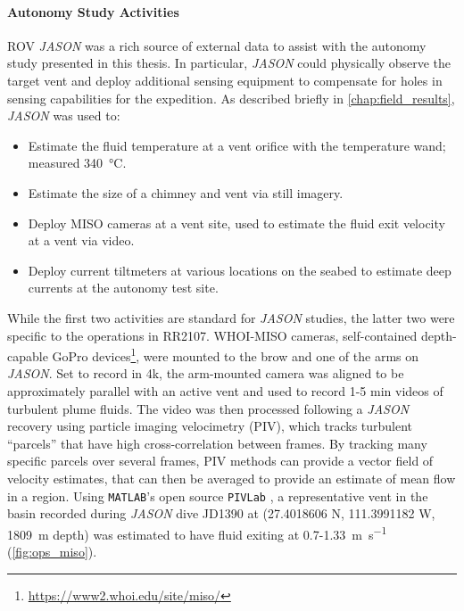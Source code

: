 \paragraph{Autonomy Study Activities}
ROV \emph{JASON} was a rich source of external data to assist with the autonomy study presented in this thesis. In particular, \emph{JASON} could physically observe the target vent and deploy additional sensing equipment to compensate for holes in \Sentry sensing capabilities for the expedition. As described briefly in \cref{chap:field_results}, \emph{JASON} was used to:
\begin{itemize}
  \item Estimate the fluid temperature at a vent orifice with the temperature wand; measured \SI{340}{\celsius}.
  \item Estimate the size of a chimney and vent via still imagery.
  \item Deploy MISO cameras at a vent site, used to estimate the fluid exit velocity at a vent via video.
  \item Deploy current tiltmeters at various locations on the seabed to estimate deep currents at the autonomy test site.
\end{itemize}

While the first two activities are standard for \emph{JASON} studies, the latter two were specific to the operations in RR2107. 
WHOI-MISO cameras, self-contained depth-capable GoPro devices\footnote{\url{https://www2.whoi.edu/site/miso/}}, were mounted to the brow and one of the arms on \emph{JASON}. Set to record in 4k, the arm-mounted camera was aligned to be approximately parallel with an active vent and used to record 1-5 min videos of turbulent plume fluids. The video was then processed following a \emph{JASON} recovery using particle imaging velocimetry\autocite{zhang2019time} (PIV), which tracks turbulent ``parcels'' that have high cross-correlation between frames. By tracking many specific parcels over several frames, PIV methods can provide a vector field of velocity estimates, that can then be averaged to provide an estimate of mean flow in a region. Using \verb|MATLAB|'s open source \verb|PIVLab| \autocite{thielicke2021particle,thielicke2014pivlab,thielicke2014flapping}, a representative vent in the basin recorded during \emph{JASON} dive JD1390 at (27.4018606 N, 111.3991182 W, \SI{1809}{\meter} depth) was estimated to have fluid exiting at 0.7-\SI{1.33}{\meter\per\second} (\cref{fig:ops_miso}).

